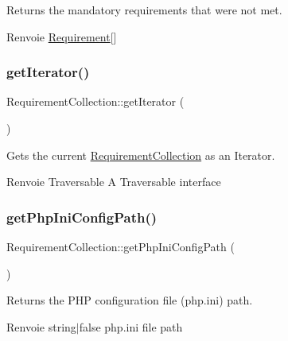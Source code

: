 Returns the mandatory requirements that were not met.

\begin{DoxyReturn}{Renvoie}
\hyperlink{classRequirement}{Requirement}\mbox{[}\mbox{]} 
\end{DoxyReturn}
\mbox{\label{classRequirementCollection_a9b1922282e30ea8d9e267e206f63e071}} 
\subsubsection{\texorpdfstring{get\+Iterator()}{getIterator()}}
{\footnotesize\ttfamily Requirement\+Collection\+::get\+Iterator (\begin{DoxyParamCaption}{ }\end{DoxyParamCaption})}

Gets the current \hyperlink{classRequirementCollection}{Requirement\+Collection} as an Iterator.

\begin{DoxyReturn}{Renvoie}
Traversable A Traversable interface 
\end{DoxyReturn}
\mbox{\label{classRequirementCollection_a40f0ae0bf0d5e4d0abcece27c151527d}} 
\subsubsection{\texorpdfstring{get\+Php\+Ini\+Config\+Path()}{getPhpIniConfigPath()}}
{\footnotesize\ttfamily Requirement\+Collection\+::get\+Php\+Ini\+Config\+Path (\begin{DoxyParamCaption}{ }\end{DoxyParamCaption})}

Returns the P\+HP configuration file (php.\+ini) path.

\begin{DoxyReturn}{Renvoie}
string$\vert$false php.\+ini file path 
\end{DoxyReturn}
\mbox{\label{classRequirementCollection_aa21bc7027e02a0366c52227fbd3acb35}} 
